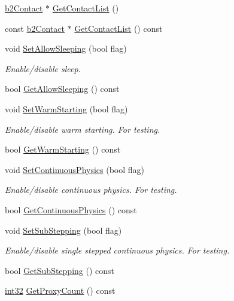 \begin{DoxyCompactItemize}
\item 
\mbox{\hyperlink{classb2_contact}{b2\+Contact}} $\ast$ \mbox{\hyperlink{classb2_world_ab1e1c59fd7534c0268c2a3e31370a425}{Get\+Contact\+List}} ()
\item 
const \mbox{\hyperlink{classb2_contact}{b2\+Contact}} $\ast$ \mbox{\hyperlink{classb2_world_a8a947dbda196b037b922d62e6a54062f}{Get\+Contact\+List}} () const
\item 
void \mbox{\hyperlink{classb2_world_a6755872564fc3db70c69d2b9d349fa33}{Set\+Allow\+Sleeping}} (bool flag)
\begin{DoxyCompactList}\small\item\em Enable/disable sleep. \end{DoxyCompactList}\item 
bool \mbox{\hyperlink{classb2_world_a3d7ce9b87a54fb4f84433f6223d81175}{Get\+Allow\+Sleeping}} () const
\item 
void \mbox{\hyperlink{classb2_world_a8e8c12142e8c4884a18787926a261359}{Set\+Warm\+Starting}} (bool flag)
\begin{DoxyCompactList}\small\item\em Enable/disable warm starting. For testing. \end{DoxyCompactList}\item 
bool \mbox{\hyperlink{classb2_world_af23e93dbf44ebfc3c7ce9dfdc00b8ff7}{Get\+Warm\+Starting}} () const
\item 
void \mbox{\hyperlink{classb2_world_a536dd9181c2e20096073e3cfe2c8530a}{Set\+Continuous\+Physics}} (bool flag)
\begin{DoxyCompactList}\small\item\em Enable/disable continuous physics. For testing. \end{DoxyCompactList}\item 
bool \mbox{\hyperlink{classb2_world_afec853cfec7a8bbffc20d4acc99963e7}{Get\+Continuous\+Physics}} () const
\item 
void \mbox{\hyperlink{classb2_world_ae8aacc78ea4753075067daff51b61778}{Set\+Sub\+Stepping}} (bool flag)
\begin{DoxyCompactList}\small\item\em Enable/disable single stepped continuous physics. For testing. \end{DoxyCompactList}\item 
bool \mbox{\hyperlink{classb2_world_aa41f23e3e12f82ce229ce644ecdac28b}{Get\+Sub\+Stepping}} () const
\item 
\mbox{\hyperlink{b2_settings_8h_a43d43196463bde49cb067f5c20ab8481}{int32}} \mbox{\hyperlink{classb2_world_a088742d580bfc42531790ea8747bb8f8}{Get\+Proxy\+Count}} () const

\end{DoxyCompactItemize}
